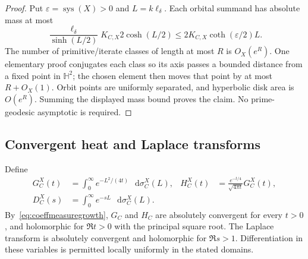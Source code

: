 \documentclass[11pt,a4paper]{article}
\numberwithin{equation}{section}
\theoremstyle{definition}
\theoremstyle{remark}
\newcommand{\dd}{\mathop{}\!\mathrm d}
\newcommand{\HH}{\mathbb H}
\begin{document}
\begin{proof}
Put $\varepsilon=\operatorname{sys}(X)>0$ and
$L=k\ell_\delta$. Each orbital summand has absolute mass at most
\[
 \frac{\ell_\delta}{\sinh(L/2)}
 K_{C,X}2\cosh(L/2)
 \leq2K_{C,X}\coth(\varepsilon/2)L.
\]
The number of primitive/iterate classes of length at most $R$ is
$O_X(e^R)$. One elementary proof conjugates each class so its axis
passes a bounded distance from a fixed point in $\HH^2$; the chosen
element then moves that point by at most $R+O_X(1)$. Orbit points
are uniformly separated, and hyperbolic disk area is $O(e^R)$.
Summing the displayed mass bound proves the claim. No prime-geodesic
asymptotic is required.
\end{proof}

\subsection{Convergent heat and Laplace transforms}

Define
\begin{align}
 G_C^X(t)&=\int_0^\infty e^{-L^2/(4t)}\,\dd\sigma_C^X(L),
 &H_C^X(t)&=\frac{e^{-t/4}}{\sqrt{4\pi t}}G_C^X(t),
 \label{eq:coeffheatdefinition}\\
 D_C^X(s)&=\int_0^\infty e^{-sL}\,\dd\sigma_C^X(L).
 &&\label{eq:coeffLaplacedefinition}
\end{align}
By~\eqref{eq:coeffmeasuregrowth}, $G_C$ and $H_C$ are absolutely
convergent for every $t>0$, and holomorphic for $\Re t>0$ with
the principal square root. The Laplace transform is absolutely
convergent and holomorphic for $\Re s>1$. Differentiation in these
variables is permitted locally uniformly in the stated domains.
\end{document}
